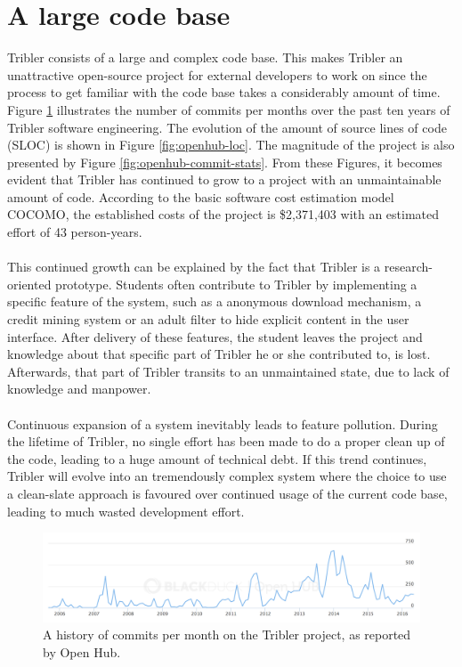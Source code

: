 \section{A large code base}
Tribler consists of a large and complex code base. This makes Tribler an unattractive open-source project for external developers to work on since the process to get familiar with the code base takes a considerably amount of time. Figure \ref{fig:openhub-commits} illustrates the number of commits per months over the past ten years of Tribler software engineering. The evolution of the amount of source lines of code (SLOC) is shown in Figure \ref{fig:openhub-loc}. The magnitude of the project is also presented by Figure \ref{fig:openhub-commit-stats}. From these Figures, it becomes evident that Tribler has continued to grow to a project with an unmaintainable amount of code. According to the basic software cost estimation model COCOMO\cite{kemerer1987empirical}, the established costs of the project is \$2,371,403 with an estimated effort of 43 person-years.\\\\
This continued growth can be explained by the fact that Tribler is a research-oriented prototype. Students often contribute to Tribler by implementing a specific feature of the system, such as a anonymous download mechanism, a credit mining system or an adult filter to hide explicit content in the user interface. After delivery of these features, the student leaves the project and knowledge about that specific part of Tribler he or she contributed to, is lost. Afterwards, that part of Tribler transits to an unmaintained state, due to lack of knowledge and manpower.\\\\
Continuous expansion of a system inevitably leads to feature pollution. During the lifetime of Tribler, no single effort has been made to do a proper clean up of the code, leading to a huge amount of technical debt. If this trend continues, Tribler will evolve into an tremendously complex system where the choice to use a clean-slate approach is favoured over continued usage of the current code base, leading to much wasted development effort.

\begin{figure}[!h]
	\centering
	\includegraphics[width=\columnwidth]{images/problem_description/openhub_commits}
	\caption{A history of commits per month on the Tribler project, as reported by Open Hub.}
	\label{fig:openhub-commits}
\end{figure}

